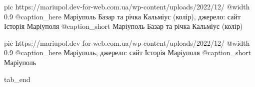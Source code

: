   pic https://mariupol.dev-for-web.com.ua/wp-content/uploads/2022/12/%
  @width 0.9
  @caption_here Маріуполь Базар та річка Кальміус (колір), джерело: сайт Історія Маріуполя
  @caption_short Маріуполь Базар та річка Кальміус (колір)

  pic https://mariupol.dev-for-web.com.ua/wp-content/uploads/2022/12/%
  @width 0.9
  @caption_here Маріуполь, джерело: сайт Історія Маріуполя
  @caption_short Маріуполь

  tab_end
\fi
